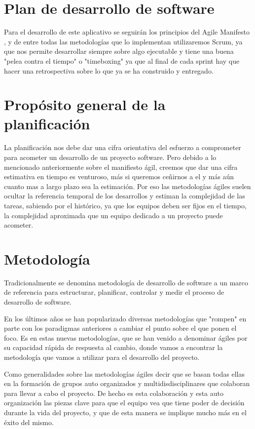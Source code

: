 \documentclass[../pfc.tex]{subfiles}
\begin{document}
	
	\section{Plan de desarrollo de software}
	
	Para el desarrollo de este aplicativo se seguirán los principios del Agile Manifesto \cite{agile}, y de entre todas las metodologías que lo implementan utilizaremos Scrum, ya que nos permite desarrollar siempre sobre algo ejecutable y tiene una buena "pelea contra el tiempo" o "timeboxing" ya que al final de cada sprint hay que hacer una retrospectiva sobre lo que ya se ha construido y entregado.

	\section{Propósito general de la planificación}
	
	La planificación nos debe dar una cifra orientativa del esfuerzo a comprometer para acometer un desarrollo de un proyecto software. Pero debido a lo mencionado anteriormente sobre el manifiesto ágil, creemos que dar una cifra estimativa en tiempo es venturoso, más si queremos ceñirnos a el y más aún cuanto mas a largo plazo sea la estimación. Por eso las metodologías ágiles suelen ocultar la referencia temporal de los desarrollos y estiman la complejidad de las tareas, sabiendo por el histórico, ya que los equipos deben ser fijos en el tiempo, la complejidad aproximada que un equipo dedicado a un proyecto puede acometer. 
	
	\section{Metodología }
	
	Tradicionalmente se denomina metodología de desarrollo de software a un marco de referencia para estructurar, planificar, controlar y medir el proceso de desarrollo de software.\cite{wiki-metodologia}
	
	En los últimos años se han popularizado diversas metodologías que "rompen" en parte con los paradigmas anteriores a cambiar el punto sobre el que ponen el foco. Es en estas nuevas metodologías, que se han venido a denominar ágiles por su capacidad rápida de respuesta al cambio, donde vamos a encontrar la metodología que vamos a utilizar para el desarrollo del proyecto.
	
	Como generalidades sobre las metodologías ágiles decir que se basan todas ellas en la formación de grupos auto organizados y multidisdisciplinares que colaboran para llevar a cabo el proyecto. De hecho es esta colaboración y esta auto organización las piezas clave para que el equipo vea que tiene poder de decisión durante la vida del proyecto, y que de esta manera se implique mucho más en el éxito del mismo.
	
\end{document}
